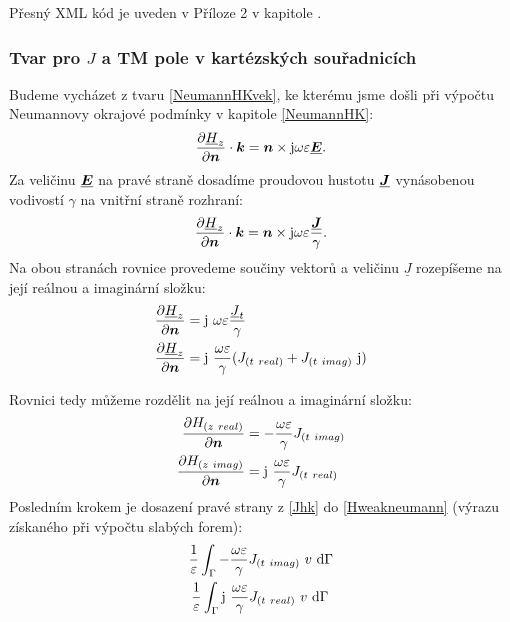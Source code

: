 \documentclass[12pt,a4paper,oneside]{article}
\numberwithin{equation}{section} %
\numberwithin{figure}{section} %
\numberwithin{table}{section} %
\newcommand{\mj}{\mathrm{j}} %
\renewcommand{\vec}[1]{\mbox{\boldmath$#1$}} %
\newcommand{\faz}[1]{{\underline{#1}}} %
\begin{document}
Přesný XML kód je uveden v Příloze 2 v kapitole .


\subsubsection*{Tvar pro \faz{\vec{J}} a TM pole v kartézských souřadnicích}
Budeme vycházet z tvaru \ref{NeumannHKvek}, ke kterému jsme došli při výpočtu Neumannovy okrajové podmínky v kapitole \ref{NeumannHK}:
\begin{equation}
\frac{\partial \faz{H} _z}{\partial \vec{n}} \cdot \vec{k} = \vec{n} \times \mj \omega \varepsilon \faz{\vec{E}}.
\end{equation}
Za veličinu $\faz{\vec{E}}$ na pravé straně dosadíme proudovou hustotu $\faz{\vec{J}}$ vynásobenou vodivostí $\gamma$ na vnitřní straně rozhraní:
\begin{equation}
\frac{\partial \faz{H}_z}{\partial \vec{n}} \cdot \vec{k} = \vec{n} \times \mj \omega \varepsilon \frac{\faz{\vec{J}}}{\gamma}.
\end{equation}
Na obou stranách rovnice provedeme součiny vektorů a veličinu $\faz{J}$ rozepíšeme na její reálnou a imaginární složku:
\begin{subequations}
\begin{align}
\frac{\partial \faz{H}_z}{\partial \vec{n}} &= \mj ~ \omega \varepsilon \frac{\faz{J} _t}{\gamma}
\\
\frac{\partial \faz{H}_z}{\partial \vec{n}} &= \mj ~ \frac{\omega \varepsilon}{\gamma} (J _{(t~real)} + J _{(t~imag)} ~ \mj)
\end{align}
\end{subequations}

Rovnici tedy můžeme rozdělit na její reálnou a imaginární složku:
\begin{subequations}
\label{Jhk}
\begin{align}
\frac{\partial H _{(z~real)}}{\partial \vec{n}} &= - \frac{\omega \varepsilon}{\gamma}  J _{(t~imag)}
\\
\frac{\partial H _{(z~imag)}}{\partial \vec{n}} &= \mj ~ \frac{\omega \varepsilon}{\gamma} J _{(t~real)}
\end{align}
\end{subequations}
Posledním krokem je dosazení pravé strany z \ref{Jhk} do \ref{Hweakneumann} (výrazu získaného při výpočtu slabých forem):
\begin{subequations}
\begin{align}
\frac{1}{\varepsilon} \int _{\Gamma} - \frac{\omega \varepsilon}{\gamma} J _{(t~imag)} ~ v ~ \ud \Gamma
\\
\frac{1}{\varepsilon} \int _{\Gamma} \mj ~ \frac{\omega \varepsilon}{\gamma} J _{(t~real)} ~ v ~ \ud \Gamma ~
\end{align}
\end{subequations}
\end{document}
